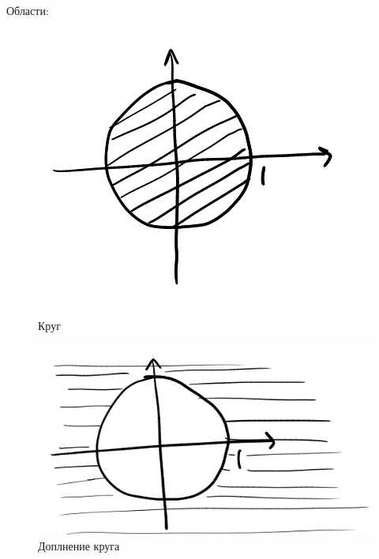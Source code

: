 \documentclass[english]{article}
\theoremstyle{plain}
\theoremstyle{remark}
\theoremstyle{definition}
\begin{document}
Области:
\begin{figure}[H]
\centering
\begin{minipage}{20em}
\includegraphics[scale=0.3]{5_3.png}
\caption{Круг}
\end{minipage}
\begin{minipage}{20em}
\includegraphics[scale=0.3]{5_4.png}
\caption{Доплнение круга}
\end{minipage}
\end{figure}
\end{document}
